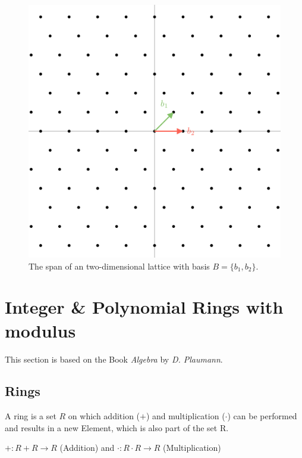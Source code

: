 \begin{figure}[ht]
  \centering
  \includegraphics[scale=0.2]{images/LatticeGrid.png}
  \caption[Span of an Lattice]{The span of an two-dimensional lattice with basis  $B = \{b_1, b_2\}$.}
  \label{fig:latticeGrid}
\end{figure}



\section{Integer \& Polynomial Rings with modulus}
This section is based on the Book \textit{Algebra} by \textit{D. Plaumann}\cite{Algebra}.

\subsection*{Rings}
A ring is a set $R$ on which addition ($+$) and multiplication ($\cdot$) can be performed and results in a new Element, which is also part of the set R.
\begin{center}
  $ +: R+R\rightarrow R$ (Addition) and $\cdot: R \cdot R \rightarrow R$ (Multiplication)
\end{center}

